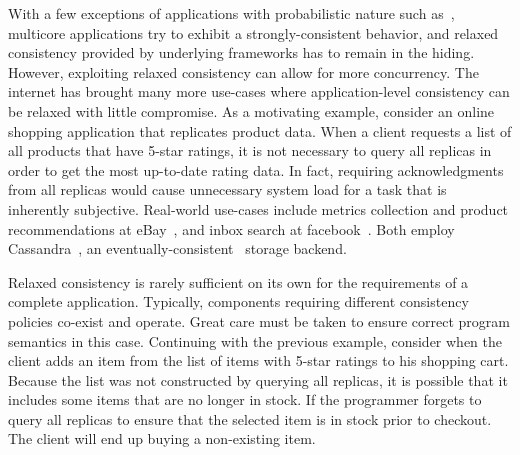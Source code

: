 \documentclass[]{usiinfprospectus}
\begin{document}
With a few exceptions of applications with probabilistic nature such as~\cite{concurrentskiplistmap}, multicore applications try to exhibit a strongly-consistent behavior, and relaxed consistency provided by underlying frameworks has to remain in the hiding. However, exploiting relaxed consistency can allow for more concurrency. 
The internet has brought many more use-cases where application-level consistency can be relaxed with little compromise. As a motivating example, consider an online shopping application that replicates product data. When a client requests a list of all products that have 5-star ratings, it is not necessary to query all replicas in order to get the most up-to-date rating data. In fact, requiring acknowledgments from all replicas would cause unnecessary system load for a task that is inherently subjective. Real-world use-cases include metrics collection and product recommendations at eBay~\cite{cassandraebay}, and inbox search at facebook~\cite{lakshman2010cassandra}. Both employ Cassandra~\cite{lakshman2010cassandra}, an eventually-consistent~\cite{vogels2009eventually} storage backend.









Relaxed consistency is rarely sufficient on its own for the requirements of a complete application. Typically, components requiring different consistency policies co-exist and operate. Great care must be taken to ensure correct program semantics in this case. Continuing with the previous example, consider  when the client adds an item from the list of items with 5-star ratings to his shopping cart. Because the list was not constructed by querying all replicas, it is possible that it includes some items that are no longer in stock. If the programmer forgets to query all replicas to ensure that the selected item is in stock prior to checkout. The client will end up buying a non-existing item.
\end{document}
